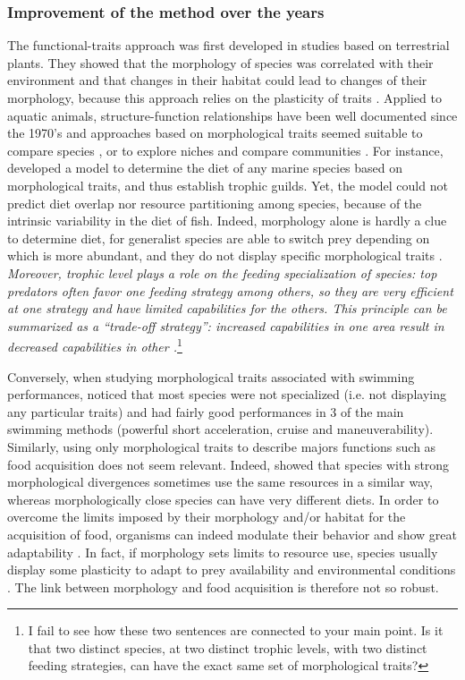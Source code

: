 \subsubsection{Improvement of the method over the years}
The functional-traits approach was first developed in studies based on terrestrial plants. They showed that the morphology of species was correlated with their environment and that changes in their habitat could lead to changes of their morphology, because this approach relies on the plasticity of traits \citep{lavorel1997,martini2020}. Applied to aquatic animals, structure-function relationships have been well documented since the 1970's \citep{gosline1971, lagler1977, webb1984} and approaches based on morphological traits seemed suitable to compare species \citep{norton1995}, or to explore niches and compare communities \citep{winemiller1991}. For instance, \citet{albouy2011} developed a model to determine the diet of any marine species based on morphological traits, and thus establish trophic guilds. Yet, the model could not predict diet overlap nor resource partitioning among species, because of the intrinsic variability in the diet of fish. Indeed, morphology alone is hardly a clue to determine diet, for generalist species are able to switch prey depending on which is more abundant, and they do not display specific morphological traits \citep{sibbing2000}. \emph{Moreover, trophic level plays a role on the feeding specialization of species: top predators often favor one feeding strategy among others, so they are very efficient at one strategy and have limited capabilities for the others. This principle can be summarized as a ``trade-off strategy'': increased capabilities in one area result in  decreased capabilities in other \citep{norton1995}.}\footnote{I fail to see how these two sentences are connected to your main point. Is it that two distinct species, at two distinct trophic levels, with two distinct feeding strategies, can have the exact same set of morphological traits?}

Conversely, when studying morphological traits associated with swimming performances, \citet{webb1984} noticed that most species were not specialized (i.e. not displaying any particular traits) and had fairly good performances in 3 of the main swimming methods (powerful short acceleration, cruise and maneuverability). Similarly, using only morphological traits to describe majors functions such as food acquisition does not seem relevant. Indeed, \citet{grossman2009} showed that species with strong morphological divergences sometimes use the same resources in a similar way, whereas morphologically close species can have very different diets. In order to overcome the limits imposed by their morphology and/or habitat for the acquisition of food, organisms can indeed modulate their behavior and show great adaptability \citep{blondel1979,grossman2009}. In fact, if morphology sets limits to resource use, species usually display some plasticity to adapt to prey availability and environmental conditions \citep{ibanez2007,sibbing2000}. The link between morphology and food acquisition is therefore not so robust. 

